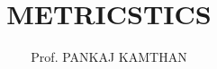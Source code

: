 \documentclass[a4paper]{report}
\title{METRICSTICS}
\author{Prof. PANKAJ KAMTHAN}
\begin{document}


\tableofcontents






\renewcommand{\bibname}{References}

\end{document}
